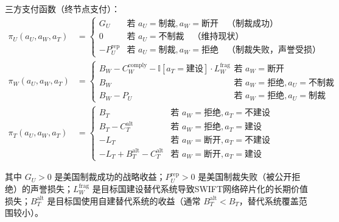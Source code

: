 \documentclass[12pt,a4paper]{ctexart}
\theoremstyle{definition}
\theoremstyle{remark}
\begin{document}
三方支付函数（终节点支付）：
\begin{align}
\pi_U(a_U, a_W, a_T) &=
\begin{cases}
G_U & \text{若 } a_U = \text{制裁}, a_W = \text{断开} \quad \text{（制裁成功）}\\
0 & \text{若 } a_U = \text{不制裁} \quad \text{（维持现状）}\\
-P_U^{\text{rep}} & \text{若 } a_U = \text{制裁}, a_W = \text{拒绝} \quad \text{（制裁失败，声誉受损）}
\end{cases}\\[6pt]
\pi_W(a_U, a_W, a_T) &=
\begin{cases}
B_W - C_W^{\text{comply}} - \mathbb{I}[a_T = \text{建设}] \cdot L_W^{\text{frag}} & \text{若 } a_W = \text{断开}\\
B_W & \text{若 } a_W = \text{拒绝}, a_U = \text{不制裁}\\
B_W - P_U & \text{若 } a_W = \text{拒绝}, a_U = \text{制裁}
\end{cases}\\[6pt]
\pi_T(a_U, a_W, a_T) &=
\begin{cases}
B_T & \text{若 } a_W = \text{拒绝}, a_T = \text{不建设}\\
B_T - C_T^{\text{alt}} & \text{若 } a_W = \text{拒绝}, a_T = \text{建设}\\
-L_T & \text{若 } a_W = \text{断开}, a_T = \text{不建设}\\
-L_T + B_T^{\text{alt}} - C_T^{\text{alt}} & \text{若 } a_W = \text{断开}, a_T = \text{建设}
\end{cases}
\end{align}

其中 $G_U > 0$ 是美国制裁成功的战略收益；$P_U^{\text{rep}} > 0$ 是美国制裁失败（被公开拒绝）的声誉损失；$L_W^{\text{frag}}$ 是目标国建设替代系统导致SWIFT网络碎片化的长期价值损失；$B_T^{\text{alt}}$ 是目标国使用自建替代系统的收益（通常 $B_T^{\text{alt}} < B_T$，替代系统覆盖范围较小）。
\end{document}
